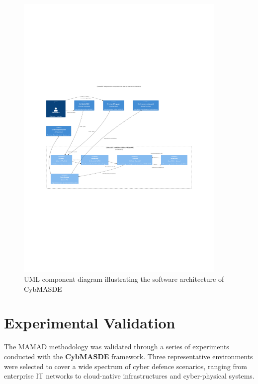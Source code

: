 \documentclass[a4paper,10pt,twocolumn]{article}
\begin{document}
\begin{figure}
    \centering
    \includegraphics[trim={2.25cm 9cm 2.25cm 10cm},clip,width=0.9\textwidth]{figures/CybMASDE_internal_component_diagram.pdf}
    \caption{UML component diagram illustrating the software architecture of CybMASDE}
    \label{fig:cybmasde_uml}
\end{figure}


\section{Experimental Validation}

The MAMAD methodology was validated through a series of experiments
conducted with the \textbf{CybMASDE} framework. Three representative
environments were selected to cover a wide spectrum of cyber defence
scenarios, ranging from enterprise IT networks to cloud-native
infrastructures and cyber-physical systems.
\end{document}
